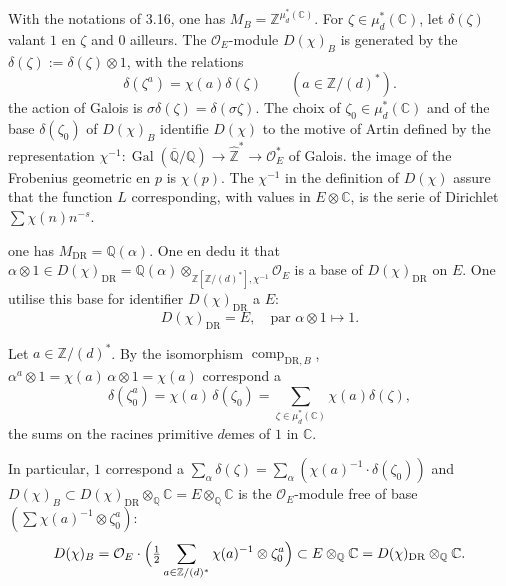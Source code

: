 \documentclass[12pt,a4paper]{article}
\theoremstyle{plain}
\theoremstyle{definition}
\theoremstyle{remark}
\DeclareMathOperator{\Gal}{Gal}
\providecommand{\Gal}{\operatorname{Gal}}
\providecommand{\DR}{\mathrm{DR}}
\providecommand{\comp}{\operatorname{comp}}
\begin{document}
With the notations of 3.16, one has $M_B = \mathbb{Z}^{\mu_d^*(\mathbb{C})}$. For
$\zeta \in \mu_d^*(\mathbb{C})$, let $\delta(\zeta)$ valant $1$ en $\zeta$ and $0$
ailleurs. The $\mathcal{O}_E$-module $D(\chi)_B$ is generated by the
$\delta(\zeta) := \delta(\zeta) \otimes 1$, with the relations
\begin{equation}\label{eq:3.17.1}
\delta(\zeta^a) = \chi(a) \delta(\zeta) \qquad (a \in \mathbb{Z}/(d)^*).
\end{equation}
the action of Galois is $\sigma \delta(\zeta) = \delta(\sigma\zeta)$. The choix of
$\zeta_0 \in \mu_d^*(\mathbb{C})$ and of the base $\delta(\zeta_0)$ of $D(\chi)_B$
identifie $D(\chi)$ to the motive of Artin defined by the representation
$\chi^{-1}: \Gal(\overline{\mathbb{Q}}/\mathbb{Q}) \to \hat{\mathbb{Z}}^* \to
\mathcal{O}_E^*$ of Galois. the image of the Frobenius geometric en $p$ is
$\chi(p)$. The $\chi^{-1}$ in the definition of $D(\chi)$ assure that the function $L$
corresponding, with values in $E \otimes \mathbb{C}$, is the serie of Dirichlet
$\sum \chi(n) n^{-s}$.

one has $M_{\DR} = \mathbb{Q}(\alpha)$. One en dedu it that
$\alpha \otimes 1 \in D(\chi)_{\DR} = \mathbb{Q}(\alpha)
\otimes_{\mathbb{Z}[\mathbb{Z}/(d)^*], \chi^{-1}} \mathcal{O}_E$ is a base of
$D(\chi)_{\DR}$ on $E$. One utilise this base for identifier $D(\chi)_{\DR}$ a $E$:
\begin{equation}\label{eq:3.17.2}
D(\chi)_{\DR} = E, \quad \text{par } \alpha \otimes 1 \longmapsto 1.
\end{equation}

Let $a \in \mathbb{Z}/(d)^*$. By the isomorphism $\comp_{\DR,B}$,
$\alpha^a \otimes 1 = \chi(a) \, \alpha \otimes 1 = \chi(a)$ correspond a
\begin{equation}\label{eq:3.17.3}
\delta(\zeta_0^a) = \chi(a) \, \delta(\zeta_0) = \sum_{\zeta \in
\mu_d^*(\mathbb{C})} \chi(a) \delta(\zeta),
\end{equation}
the sums on the racines primitive $d$emes of $1$ in $\mathbb{C}$.

In particular, $1$ correspond a $\sum_{\alpha} \delta(\zeta) = \sum_\alpha
(\chi(a)^{-1} \cdot \delta(\zeta_0))$ and $D(\chi)_B \subset D(\chi)_{\DR} \otimes_{\mathbb{Q}}
\mathbb{C} = E \otimes_{\mathbb{Q}} \mathbb{C}$ is the $\mathcal{O}_E$-module free of base
$(\sum \chi(a)^{-1} \otimes \zeta_0^a)$:
\begin{equation}\label{eq:3.17.4}
D(\chi)_B = \mathcal{O}_E \cdot \Bigl(\tfrac{1}{2} \sum_{a \in \mathbb{Z}/(d)^*}
\chi(a)^{-1} \otimes \zeta_0^a\Bigr) \subset E \otimes_{\mathbb{Q}} \mathbb{C} =
D(\chi)_{\DR} \otimes_{\mathbb{Q}} \mathbb{C}.
\end{equation}
\end{document}
